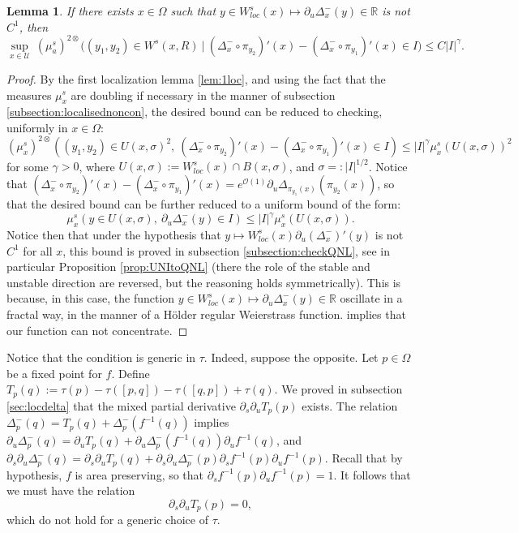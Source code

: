 \documentclass[a4paper]{article}
\newtheorem{lemma}[theorem]{Lemma}
\theoremstyle{definition}
\begin{document}
\begin{lemma}\label{lem:E7}
If there exists $x \in \Omega$ such that $y \in W^s_{loc}(x) \longmapsto \partial_u \Delta^-_x(y) \in \mathbb{R}$ is not $C^1$, then $$ \sup_{x \in \mathcal{U}} \ (\mu^s_a)^{2\otimes}\Big( (y_1,y_2) \in W^s(x,R) \ \Big| \  (\Delta^-_x \circ \pi_{y_2})'(x) - (\Delta^-_x \circ \pi_{y_1})'(x) \in I \Big) \leq C |I|^\gamma .$$
\end{lemma}

\begin{proof}
By the first localization lemma \ref{lem:1loc}, and using the fact that the measures $\mu_x^s$ are doubling if necessary in the manner of subsection \ref{subsection:localisednoncon}, the desired bound can be reduced to checking, uniformly in $x \in \Omega$:
$$ (\mu_x^s)^{2 \otimes}( (y_1,y_2) \in U(x,\sigma)^2, \ (\Delta^-_x \circ \pi_{y_2})'(x)-(\Delta^-_x \circ \pi_{y_1})'(x) \in I ) \leq |I|^\gamma \mu_x^s(U(x,\sigma))^2 $$
for some $\gamma>0$, where $U(x,\sigma) := W^s_{loc}(x) \cap B(x,\sigma)$, and $\sigma =: |I|^{1/2}$. Notice that $(\Delta^-_x \circ \pi_{y_2})'(x) - (\Delta^-_x \circ \pi_{y_1})'(x) = e^{\mathcal{O}(1)} \partial_u\Delta_{\pi_{y_1}(x)}(\pi_{y_2}(x))$, so that the desired bound can be further reduced to a uniform bound of the form:
$$ \mu_x^s( y \in U(x,\sigma), \ \partial_u \Delta^-_{x}(y) \in I ) \leq |I|^\gamma \mu_x^s(U(x,\sigma)). $$
Notice then that under the hypothesis that $y \mapsto W_{loc}^{s}(x) \partial_u (\Delta^-_{x})'(y)$ is not $C^1$ for all $x$, this bound is proved in subsection \ref{subsection:checkQNL}, see in particular Proposition \ref{prop:UNItoQNL} (there the role of the stable and unstable direction are reversed, but the reasoning holds symmetrically). This is because, in this case, the function $y \in W^s_{loc}(x) \mapsto \partial_u \Delta^-_{x}(y) \in \mathbb{R}$ oscillate in a fractal way, in the manner of a Hölder regular Weierstrass function.  implies that our function can not concentrate.
\end{proof}

Notice that the condition  is generic in $\tau$. Indeed, suppose the opposite. Let $p \in \Omega$ be a fixed point for $f$. Define $T_p(q) := \tau(p) - \tau([p,q]) - \tau([q,p]) + \tau(q)$. We proved in subsection \ref{sec:locdelta} that the mixed partial derivative $\partial_s \partial_u T_p(p)$ exists. The relation $\Delta^-_p(q) = T_p(q) + \Delta^-_p(f^{-1}(q))$ implies $\partial_u\Delta^-_p(q) = \partial_u T_p(q) + \partial_u\Delta^-_p(f^{-1}(q)) \partial_u f^{-1}(q)$, and $\partial_s \partial_u\Delta^-_p(q) = \partial_s \partial_u T_p(q) + \partial_s \partial_u\Delta^-_p(p) \partial_s f^{-1}(p) \partial_u f^{-1}(p)$. Recall that by hypothesis, $f$ is area preserving, so that $\partial_s f^{-1}(p) \partial_u f^{-1}(p)=1$. It follows that we must have the relation $$ \partial_s \partial_u T_p(p) = 0 ,$$
which do not hold for a generic choice of $\tau$.
\end{document}
